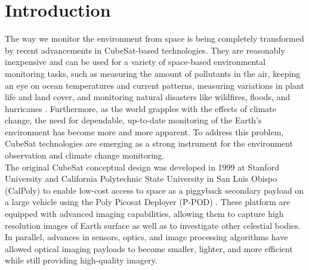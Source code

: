 \documentclass[final,5p,times,sort&compress,twocolumn]{elsarticle}
\begin{document}
\section{Introduction}
The way we monitor the environment from space is being completely transformed by recent advancements in CubeSat-based technologies. They are reasonably inexpensive and can be used for a variety of space-based environmental monitoring tasks, such as measuring the amount of pollutants in the air, keeping an eye on ocean temperatures and current patterns, measuring variations in plant life and land cover, and monitoring natural disasters like wildfires, floods, and hurricanes \citep{chadalavada2021regional}. Furthermore, as the world grapples with the effects of climate change, the need for dependable, up-to-date monitoring of the Earth's environment has become more and more apparent. To address this problem, CubeSat technologies are emerging as a strong instrument for the environment observation and climate change monitoring. \\ 
The original CubeSat conceptual design was developed in 1999 at Stanford University and California Polytechnic State University in San Luis Obispo (CalPoly) to enable low-cost access to space as a piggyback secondary payload on a large vehicle using the Poly Picosat Deployer (P-POD) \citep{welle2020overview, jin2013optical}. These platform are equipped with advanced imaging capabilities, allowing them to capture high resolution images of Earth surface as well as to investigate other celestial bodies. In parallel, advances in sensors, optics, and image processing algorithms have allowed optical imaging payloads to become smaller, lighter, and more efficient while still providing high-quality imagery.\\
\end{document}
